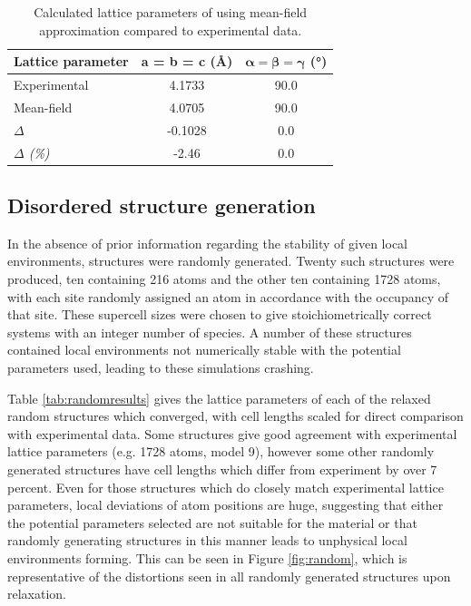 \newcommand{\tableline}{\multicolumn{1}{c}{--}}
\newcommand{\tableliner}{\multicolumn{1}{c}{{\color{red}--}}}
\newcommand{\mc}[1]{\multicolumn{1}{c}{#1}}

\begin{table}[h]
\centering
\caption{Calculated lattice parameters of  using mean-field approximation compared to experimental data.}
\begin{tabular}{lS[table-format=1.4]S[table-format=2.1]}
\toprule
\textbf{Lattice parameter} &\mc{\textbf{a} = \textbf{b} = \textbf{c} (\AA)} & \mc{$\boldsymbol{\alpha} = \boldsymbol{\beta} = \boldsymbol{\gamma}$ (\si{\degree})}\\
\midrule
Experimental \cite{Freire2016} &  4.1733  & 90.0 \\
Mean-field                     &  4.0705  & 90.0 \\ 
\textit{$\Delta$}              & -0.1028  & 0.0  \\
\textit{$\Delta$ (\%)}         & -2.46    & 0.0  \\\bottomrule
\end{tabular}
\end{table}
\newpage

\subsection{Disordered structure generation}
In the absence of prior information regarding the stability of given local environments, structures were randomly generated.
Twenty such structures were produced, ten containing 216 atoms and the other ten containing 1728 atoms, with each site randomly assigned an atom in accordance with the occupancy of that site.
These supercell sizes were chosen to give stoichiometrically correct systems with an integer number of species.
A number of these structures contained local environments not numerically stable with the potential parameters used, leading to these simulations crashing.

Table \ref{tab:randomresults} gives the lattice parameters of each of the relaxed random structures which converged, with cell lengths scaled for direct comparison with experimental data.\cite{Freire2016}
Some structures give good agreement with experimental lattice parameters (e.g. 1728 atoms, model 9), however some other randomly generated structures have cell lengths which differ from experiment by over 7 percent.%
Even for those structures which do closely match experimental lattice parameters, local deviations of atom positions are huge, suggesting that either the potential parameters selected are not suitable for the material or that randomly generating structures in this manner leads to unphysical local environments forming. This can be seen in Figure \ref{fig:random}, which is representative of the distortions seen in all randomly generated structures upon relaxation.

